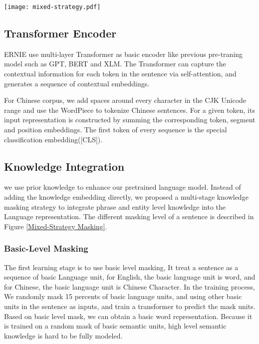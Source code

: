 \documentclass[11pt,a4paper]{article}
\begin{document}
\begin{figure*} 
\centerline{\texttt{[image: mixed-strategy.pdf]}}
\caption{Different masking level of a sentence}
\label{Mixed-Strategy Masking}
\end{figure*}

\subsection{Transformer Encoder} 
ERNIE use multi-layer Transformer \cite{vaswani2017attention} as basic encoder like  previous pre-traning model such as GPT, BERT and XLM. 
The Transformer can capture the contextual information for each token in the sentence via self-attention, and generates a sequence of contextual embeddings. 

For Chinese corpus, we add spaces around every character in the CJK Unicode range and use the WordPiece \cite{wu2016google} to tokenize Chinese sentences. 
For a given token, its input representation is constructed by summing the corresponding token, segment and position embeddings. The first token of every sequence is the special classification embedding([CLS]).

\subsection{Knowledge Integration}
we use prior knowledge to enhance our pretrained language model. Instead of adding the knowledge embedding directly, we proposed a multi-stage knowledge masking strategy to integrate phrase and entity level knowledge into the Language representation. The different masking level of a sentence is described in Figure \ref{Mixed-Strategy Masking}.

\subsubsection{Basic-Level Masking}
The first learning stage is to use basic level masking, It treat a sentence as a sequence of basic Language unit, for English, the basic language unit is word, and for Chinese, the basic language unit is Chinese Character. In the training process, We randomly mask 15 percents of basic language units, and using other basic units in the sentence as inputs, and train a transformer to predict the mask units.
Based on basic level mask, we can obtain a basic word representation. Because it is trained on a random mask of basic semantic units, high level semantic knowledge is hard to be fully modeled.
\end{document}
